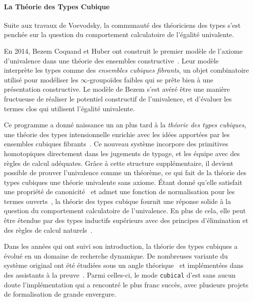\paragraph*{La Théorie des Types Cubique}
% 
Suite aux travaux de Voevodsky, la communauté des théoriciens des types
s'est penchée sur la question du comportement calculatoire de l'égalité 
univalente.

En 2014, Bezem Coquand et Huber ont construit le premier modèle de l'axiome d'univalence 
dans une théorie des ensembles constructive~.
% 
Leur modèle interprète les types comme des \emph{ensembles cubiques fibrants}, un 
objet combinatoire utilisé pour modéliser les \( \infty \)-groupoïdes faibles qui se prête 
bien à une présentation constructive. 
% 
Le modèle de Bezem \etal s'est avéré être une manière fructueuse
de réaliser le potentiel constructif de l'univalence, et d'évaluer les termes 
clos qui utilisent l'égalité univalente.

Ce programme a donné naissance un an plus tard à la 
\emph{théorie des types cubiques}, une théorie des types intensionnelle enrichie 
avec les idées apportées par les ensembles cubiques fibrants~.
% 
Ce nouveau système incorpore des primitives homotopiques directement dans les 
jugements de typage, et les équipe avec des règles de calcul adéquates. 
% 
Grâce à cette structure supplémentaire, il devient possible de prouver 
l'univalence comme un théorème, ce qui fait de la théorie des types cubiques une théorie 
univalente sans axiome.
% 
Étant donné qu'elle satisfait une propriété de canonicité~ et admet 
une fonction de normalisation pour les termes ouverts~, 
la théorie des types cubique fournit une réponse solide à la question du comportement 
calculatoire de l'univalence.
% 
En plus de cela, elle peut être étendue par des types inductifs supérieurs avec des 
principes d'élimination et des règles de calcul naturels~.

Dans les années qui ont suivi son introduction, la théorie des types cubiques a 
évolué en un domaine de recherche dynamique. 
% 
De nombreuses variante du système original ont été étudiées sous un angle 
théorique~\cite{AngiuliHouHarper18,ABCFHL} et implémentées dans des assistants à la 
preuve~\cite{Cubicaltt, redtt}. 
% 
Parmi celles-ci, le mode \texttt{cubical} d'\Agda est sans aucun doute l'implémentation 
qui a rencontré le plus franc succès, avec plusieurs projets de formalisation de 
grande envergure.

